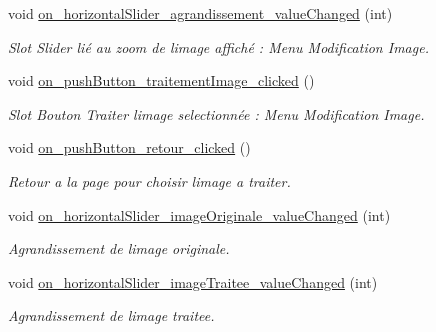 \begin{DoxyCompactItemize}
\mbox{\label{classMainWindow_acb133bc5aa31c34985de1f1d29ad17f9}} 
void \hyperlink{classMainWindow_acb133bc5aa31c34985de1f1d29ad17f9}{on\+\_\+horizontal\+Slider\+\_\+agrandissement\+\_\+value\+Changed} (int)
\begin{DoxyCompactList}\small\item\em Slot Slider lié au zoom de l\textquotesingle{}image affiché \+: Menu Modification Image. \end{DoxyCompactList}\item 
\mbox{\label{classMainWindow_adf60caef775208cb39eff294981c9e88}} 
void \hyperlink{classMainWindow_adf60caef775208cb39eff294981c9e88}{on\+\_\+push\+Button\+\_\+traitement\+Image\+\_\+clicked} ()
\begin{DoxyCompactList}\small\item\em Slot Bouton Traiter l\textquotesingle{}image selectionnée \+: Menu Modification Image. \end{DoxyCompactList}\item 
\mbox{\label{classMainWindow_aec65250d1c32225746ec18aa394a943f}} 
void \hyperlink{classMainWindow_aec65250d1c32225746ec18aa394a943f}{on\+\_\+push\+Button\+\_\+retour\+\_\+clicked} ()
\begin{DoxyCompactList}\small\item\em Retour a la page pour choisir l\textquotesingle{}image a traiter. \end{DoxyCompactList}\item 
\mbox{\label{classMainWindow_aa9835b27970c4d853eda5430f168145f}} 
void \hyperlink{classMainWindow_aa9835b27970c4d853eda5430f168145f}{on\+\_\+horizontal\+Slider\+\_\+image\+Originale\+\_\+value\+Changed} (int)
\begin{DoxyCompactList}\small\item\em Agrandissement de l\textquotesingle{}image originale. \end{DoxyCompactList}\item 
\mbox{\label{classMainWindow_aa02bacdc44ef7bf15d0ed596a08c30a7}} 
void \hyperlink{classMainWindow_aa02bacdc44ef7bf15d0ed596a08c30a7}{on\+\_\+horizontal\+Slider\+\_\+image\+Traitee\+\_\+value\+Changed} (int)
\begin{DoxyCompactList}\small\item\em Agrandissement de l\textquotesingle{}image traitee. \end{DoxyCompactList}\item 

\end{DoxyCompactItemize}
